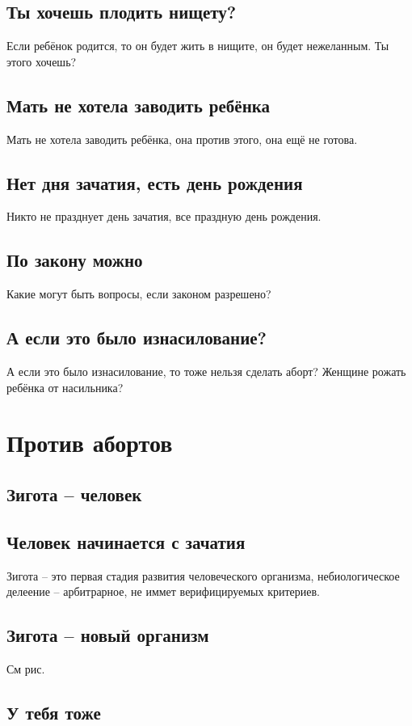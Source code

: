 \documentclass[a4paper,12pt]{report}
\begin{document}
    \section{Ты хочешь плодить нищету?}
        Если ребёнок родится, то он будет жить в нищите, он будет нежеланным. Ты этого хочешь?
    \section{Мать не хотела заводить ребёнка}
        Мать не хотела заводить ребёнка, она против этого, она ещё не готова.
    \section{Нет дня зачатия, есть день рождения}
        Никто не празднует день зачатия, все праздную день рождения.
    \section{По закону можно}
        Какие могут быть вопросы, если законом разрешено?
    \section{А если это было изнасилование?}
        А если это было изнасилование, то тоже нельзя сделать аборт? Женщине рожать ребёнка от насильника?

\chapter{Против абортов}
	\section{Зигота -- человек}
	\section{Человек начинается с зачатия}
        Зигота -- это первая стадия развития человеческого организма, небиологическое делеение -- арбитрарное, не иммет верифицируемых критериев.
	\section{Зигота -- новый организм}
        См рис. %
    \section{У тебя тоже}
\end{document}

